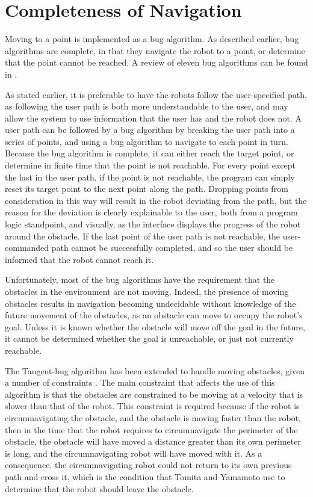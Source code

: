 \section{Completeness of Navigation}

Moving to a point is implemented as a bug algorithm. As described earlier, bug algorithms are complete, in that they navigate the robot to a point, or determine that the point cannot be reached. A review of eleven bug algorithms can be found in \citep{ng2007performance}. 

As stated earlier, it is preferable to have the robots follow the user-specified path, as following the user path is both more understandable to the user, and may allow the system to use information that the user has and the robot does not. 
A user path can be followed by a bug algorithm by breaking the user path into a series of points, and using a bug algorithm to navigate to each point in turn. 
Because the bug algorithm is complete, it can either reach the target point, or determine in finite time that the point is not reachable. 
For every point except the last in the user path, if the point is not reachable, the program can simply reset its target point to the next point along the path. 
Dropping points from consideration in this way will result in the robot deviating from the path, but the reason for the deviation is clearly explainable to the user, both from a program logic standpoint, and visually, as the interface displays the progress of the robot around the obstacle. 
If the last point of the user path is not reachable, the user-commanded path cannot be successfully completed, and so the user should be informed that the robot cannot reach it. 

Unfortunately, most of the bug algorithms have the requirement that the obstacles in the environment are not moving.
Indeed, the presence of moving obstacles results in navigation becoming undecidable without knowledge of the future movement of the obstacles, as an obstacle can move to occupy the robot's goal. 
Unless it is known whether the obstacle will move off the goal in the future, it cannot be determined whether the goal is unreachable, or just not currently reachable. 

The Tangent-bug algorithm has been extended to handle moving obstacles, given a number of constraints \citep{kamon1998tangentbug, tomita2009sensor}.
The main constraint that affects the use of this algorithm is that the obstacles are constrained to be moving at a velocity that is slower than that of the robot.
This constraint is required because if the robot is circumnavigating the obstacle, and the obstacle is moving faster than the robot, then in the time that the robot requires to circumnavigate the perimeter of the obstacle, the obstacle will have moved a distance greater than its own perimeter is long, and the circumnavigating robot will have moved with it.
As a consequence, the circumnavigating robot could not return to its own previous path and cross it, which is the condition that Tomita and Yamamoto use to determine that the robot should leave the obstacle. 

